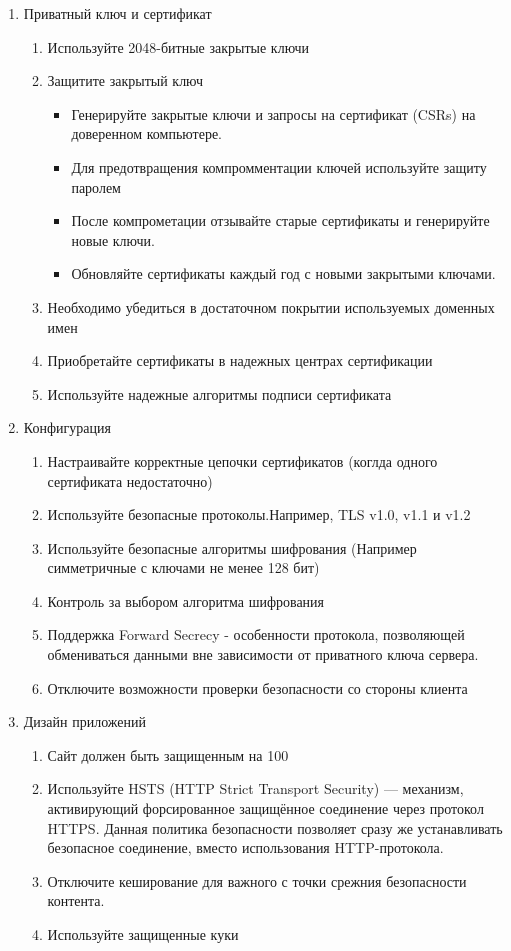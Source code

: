 \documentclass[10pt,a4paper,titlepage]{article}
\begin{document}
\begin{enumerate}
\item Приватный ключ и сертификат

\begin{enumerate}
\item Используйте 2048-битные закрытые ключи
\item Защитите закрытый ключ
\begin{itemize}
\item Генерируйте закрытые ключи и запросы на сертификат (CSRs) на доверенном компьютере.
\item Для предотвращения компромментации ключей используйте защиту паролем
\item После компрометации отзывайте старые сертификаты и генерируйте новые ключи. 
\item Обновляйте сертификаты каждый год с новыми закрытыми ключами. 
\end{itemize}
\item Необходимо убедиться в достаточном покрытии используемых доменных имен
\item Приобретайте сертификаты в надежных центрах сертификации
\item Используйте надежные алгоритмы подписи сертификата 
\end{enumerate}

\item Конфигурация 

\begin{enumerate}
\item Настраивайте корректные цепочки сертификатов (коглда одного сертификата недостаточно)
\item Используйте безопасные протоколы.Например, TLS v1.0, v1.1 и v1.2 
\item Используйте безопасные алгоритмы шифрования (Например симметричные с ключами не менее 128 бит)
\item Контроль за выбором алгоритма шифрования 
\item Поддержка Forward Secrecy - особенности протокола, позволяющей обмениваться данными вне зависимости от приватного ключа сервера.  
\item  Отключите возможности проверки безопасности со стороны клиента
\end{enumerate}


\item Дизайн приложений 

\begin{enumerate}
\item Сайт должен быть защищенным на 100%
\item Используйте HSTS (HTTP Strict Transport Security) — механизм, активирующий форсированное защищённое соединение через протокол HTTPS. Данная политика безопасности позволяет сразу же устанавливать безопасное соединение, вместо использования HTTP-протокола.
\item Отключите кеширование для важного с точки срежния безопасности контента.
\item Используйте защищенные куки
\end{enumerate}

\end{enumerate}
\end{document}

